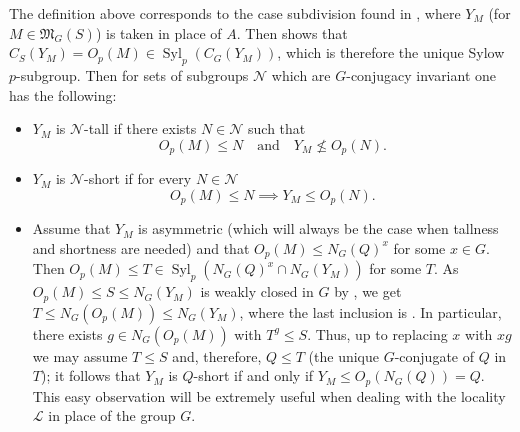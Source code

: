 \documentclass{amsart}
\numberwithin{equation}{section}
\theoremstyle{definition}
\theoremstyle{subresult}
\theoremstyle{caseresult}
\newcommand{\gM}{\mathfrak{M}}
\newcommand{\N}{\mathcal{N}}
\renewcommand{\L}{\mathcal{L}}
\newcommand{\Syl}{\operatorname{Syl}}
\newcommand{\<}{\langle}
\renewcommand{\>}{\rangle}
\begin{document}
The definition above corresponds to the case subdivision found in \cite[Notation 2.1]{Meier-Stell-Stroth:2012}, where $Y_M$ (for $M \in \gM_G(S)$) is taken in place of $A$. Then \cite[Lemma 2.2(f)]{Meier-Stell-Stroth:2012} shows that $C_S(Y_M) = O_p(M) \in \Syl_p(C_G(Y_M))$, which is therefore the unique Sylow $p$-subgroup. Then for sets of subgroups $\N$ which are $G$-conjugacy invariant one has the following:
\begin{itemize}
	\item $Y_M$ is $\N$-tall if there exists $N \in \N$ such that 
		\[
		O_p(M) \le N \quad \text{and} \quad Y_M \not \le O_p(N).
		\]
	\item $Y_M$ is $\N$-short if for every $N \in \N$
		\[
		O_p(M) \le N \implies Y_M \le O_p(N).
		\]
	\item Assume that $Y_M$ is asymmetric (which will always be the case when tallness and shortness are needed) and that $O_p(M) \le N_G(Q)^x$ for some $x \in G$. Then $O_p(M) \le T \in \Syl_p(N_G(Q)^x \cap N_G(Y_M))$ for some $T$. As $O_p(M) \le S \le N_G(Y_M)$ is weakly closed in $G$ by \cite[Lemma 2.6(b)]{Meier-Stell-Stroth:2012}, we get $T \le N_G(O_p(M)) \le N_G(Y_M)$, where the last inclusion is \cite[Lemma 2.2(c)]{Meier-Stell-Stroth:2012}. In particular, there exists $g \in N_G(O_p(M))$ with $T^g \le S$. Thus, up to replacing $x$ with $xg$ we may assume $T \le S$ and, therefore, $Q \le T$ (the unique $G$-conjugate of $Q$ in $T$); it follows that $Y_M$ is $Q$-short if and only if $Y_M \le O_p(N_G(Q)) = Q$.  This easy observation will be extremely useful when dealing with the locality $\L$ in place of the group $G$.
\end{itemize}
\end{document}

